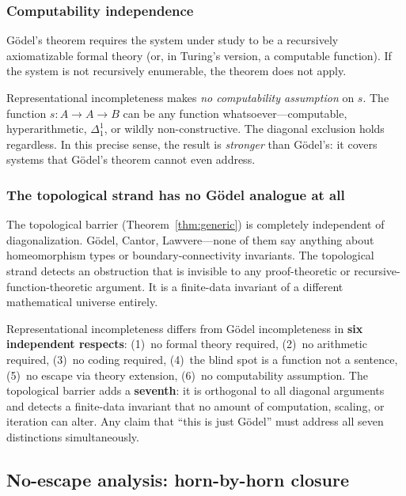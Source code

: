 \documentclass[11pt]{article}
\begin{document}
\subsubsection{Computability independence}

G\"odel's theorem requires the system under study to be a recursively
axiomatizable formal theory (or, in Turing's version, a computable
function).  If the system is not recursively enumerable, the theorem does
not apply.

Representational incompleteness makes \emph{no computability assumption}
on $s$.  The function $s : A \to A \to B$ can be any function
whatsoever---computable, hyperarithmetic, $\Delta^1_1$, or wildly
non-constructive.  The diagonal exclusion holds regardless.  In this
precise sense, the result is \emph{stronger} than G\"odel's: it covers
systems that G\"odel's theorem cannot even address.

\subsubsection{The topological strand has no G\"odel analogue at all}

The topological barrier (Theorem~\ref{thm:generic}) is completely
independent of diagonalization.  G\"odel, Cantor, Lawvere---none of them
say anything about homeomorphism types or boundary-connectivity
invariants.  The topological strand detects an obstruction that is
invisible to any proof-theoretic or recursive-function-theoretic argument.
It is a finite-data invariant of a different mathematical universe entirely.

\begin{keybox}[title={Not G\"odel repackaged: a summary}]
Representational incompleteness differs from G\"odel incompleteness
in \textbf{six independent respects}: (1)~no formal theory required,
(2)~no arithmetic required, (3)~no coding required, (4)~the blind
spot is a function not a sentence, (5)~no escape via theory
extension, (6)~no computability assumption.  The topological barrier
adds a \textbf{seventh}: it is orthogonal to all diagonal arguments
and detects a finite-data invariant that no amount of computation,
scaling, or iteration can alter.  Any claim that ``this is just
G\"odel'' must address all seven distinctions simultaneously.
\end{keybox}

\subsection{No-escape analysis: horn-by-horn closure}
\label{sec:noescape}
\end{document}

